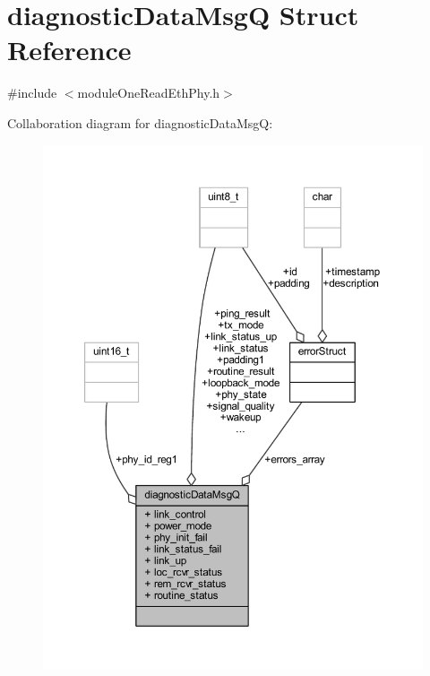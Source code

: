 \hypertarget{structdiagnostic_data_msg_q}{}\section{diagnostic\+Data\+MsgQ Struct Reference}
\label{structdiagnostic_data_msg_q}


{\ttfamily \#include $<$module\+One\+Read\+Eth\+Phy.\+h$>$}



Collaboration diagram for diagnostic\+Data\+MsgQ\+:
\nopagebreak
\begin{figure}[H]
\begin{center}
\leavevmode
\includegraphics[width=350pt]{structdiagnostic_data_msg_q__coll__graph}
\end{center}
\end{figure}
